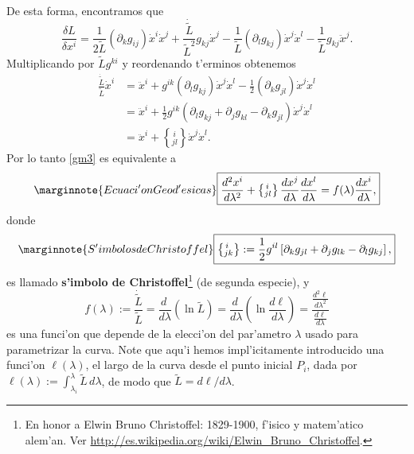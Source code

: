 De esta forma, encontramos que
\begin{equation}
\frac{\delta L}{\delta x^i }=\frac{1}{2\tilde{L}}(\partial_k g_{ij})\dot{x}^i\dot{x}^j+\frac{\dot{\tilde{L}}}{\tilde{L}^2}g_{kj}\dot{x}^j-\frac{1}{\tilde{L}}(\partial_l g_{kj})\dot{x}^j\dot{x}^l-\frac{1}{\tilde{L}}g_{kj}\ddot{x}^j.
\end{equation}
Multiplicando por $\tilde{L}g^{ki}$ y reordenando t'erminos obtenemos
\begin{align}
\frac{\dot{\tilde{L}}}{\tilde{L}}\dot{x}^i &= \ddot{x}^i+g^{ik}(\partial_l g_{kj})\dot{x}^j\dot{x}^l-\frac{1}{2}(\partial_k g_{jl})\dot{x}^j\dot{x}^l \\
&= \ddot{x}^i+\frac{1}{2}g^{ik}\left(\partial_l g_{kj}+\partial_j g_{kl}-\partial_k g_{jl}\right)\dot{x}^j\dot{x}^l \\
&= \ddot{x}^i+\left\{ _{jl}^{\,i}\right\}\dot{x}^j\dot{x}^l.
\end{align}
Por lo tanto \eqref{gm3} es equivalente a 
\begin{equation}\marginnote{Ecuaci'on Geod'esicas}
\boxed{\frac{d^2x^i }{d\lambda^2}+\left\{ _{ j l}^{\, i}\right\}
\frac{dx^j }{d\lambda}\frac{dx^{ l}}{d\lambda}=f(\lambda)\frac{dx^{ i
}}{d\lambda},} \label{gm5}
\end{equation}
donde
\begin{equation}\marginnote{S'imbolos de Christoffel}
\boxed{\left\{ _{ jk}^{\,i}\right\}:=\frac{1}2g^{il}\left[
\partial_kg_{jl}+\partial_j g_{lk}-\partial_l g_{kj}\right] ,} \label{gm6}
\end{equation}
es llamado \textbf{s'imbolo de Christoffel}\footnote{En honor a Elwin Bruno Christoffel: 1829-1900, f'isico y matem'atico alem'an. Ver \url{http://es.wikipedia.org/wiki/Elwin_Bruno_Christoffel}.} (de segunda especie), y
\begin{equation}
f(\lambda):=\frac{\dot{\tilde{L}}}{\tilde{L}}=\frac{d\ }{d\lambda}\left(\ln\tilde{L}\right)=\frac{d\ }{d\lambda}\left(\ln\frac{d\ell}{d\lambda}\right) =\frac{\frac{d^2\ell}{d\lambda^2}}{\frac{d\ell}{d\lambda}}\label{efe}
\end{equation}
 es una funci'on que depende de la elecci'on del par'ametro $\lambda$ usado para parametrizar la curva. Note que aqu'i hemos impl'icitamente introducido una funci'on $\ell(\lambda)$, el largo de la curva desde el punto inicial $P_i$, dada por $\ell(\lambda):=\int_{\lambda_i}^\lambda \tilde{L}\,d\lambda$, de modo que $\tilde{L}=d\ell/ d\lambda$.

